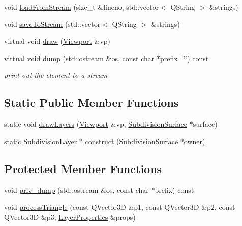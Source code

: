 \begin{DoxyCompactItemize}
\item 
void \hyperlink{classShipCAD_1_1SubdivisionLayer_af86299eea0a5a472d1edfae2706e335a}{load\-From\-Stream} (size\-\_\-t \&lineno, std\-::vector$<$ Q\-String $>$ \&strings)
\item 
void \hyperlink{classShipCAD_1_1SubdivisionLayer_a502c7889a73015d4295fb922c92c78be}{save\-To\-Stream} (std\-::vector$<$ Q\-String $>$ \&strings)
\item 
virtual void \hyperlink{classShipCAD_1_1SubdivisionLayer_a86f8600ffbf3973bc31c99bdb9e5b18d}{draw} (\hyperlink{classShipCAD_1_1Viewport}{Viewport} \&vp)
\item 
virtual void \hyperlink{classShipCAD_1_1SubdivisionLayer_ab41e005f720a2bba4b2efa74bfd5943e}{dump} (std\-::ostream \&os, const char $\ast$prefix=\char`\"{}\char`\"{}) const 
\begin{DoxyCompactList}\small\item\em print out the element to a stream \end{DoxyCompactList}\end{DoxyCompactItemize}
\subsection*{Static Public Member Functions}
\begin{DoxyCompactItemize}
\item 
static void \hyperlink{classShipCAD_1_1SubdivisionLayer_a838537201ca31bc92a38585c87eb56e9}{draw\-Layers} (\hyperlink{classShipCAD_1_1Viewport}{Viewport} \&vp, \hyperlink{classShipCAD_1_1SubdivisionSurface}{Subdivision\-Surface} $\ast$surface)
\item 
static \hyperlink{classShipCAD_1_1SubdivisionLayer}{Subdivision\-Layer} $\ast$ \hyperlink{classShipCAD_1_1SubdivisionLayer_a7d41b9d0ff65032014ec52ff846f32a7}{construct} (\hyperlink{classShipCAD_1_1SubdivisionSurface}{Subdivision\-Surface} $\ast$owner)
\end{DoxyCompactItemize}
\subsection*{Protected Member Functions}
\begin{DoxyCompactItemize}
\item 
void \hyperlink{classShipCAD_1_1SubdivisionLayer_a80009b02c31a01e2de9f93d5982b9a63}{priv\-\_\-dump} (std\-::ostream \&os, const char $\ast$prefix) const 
\item 
void \hyperlink{classShipCAD_1_1SubdivisionLayer_abea7581d3e0b740de8db1dfd6bc9bf69}{process\-Triangle} (const Q\-Vector3\-D \&p1, const Q\-Vector3\-D \&p2, const Q\-Vector3\-D \&p3, \hyperlink{structShipCAD_1_1LayerProperties}{Layer\-Properties} \&props)
\end{DoxyCompactItemize}
